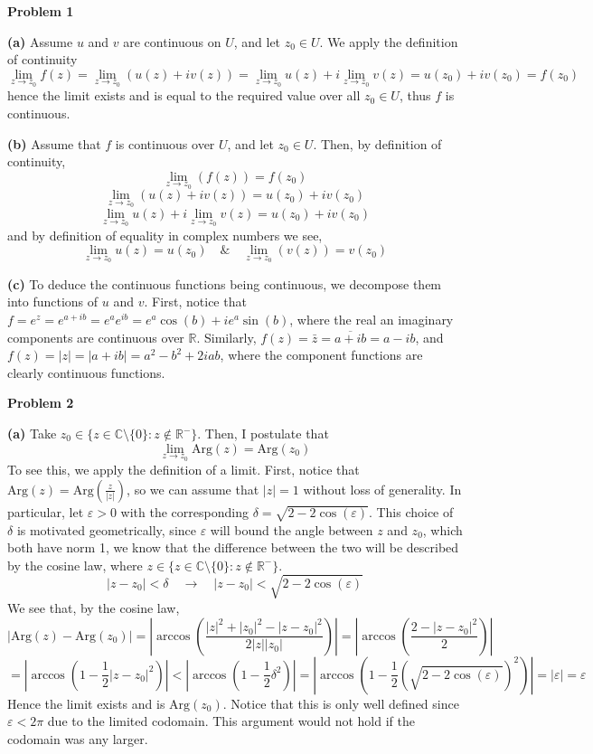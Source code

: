 \documentclass[10pt]{article}
\newcommand{\R}{\mathbb{R}}
\newcommand{\C}{\mathbb{C}}
\newcommand{\Arg}{\text{Arg}}
\begin{document}
\textbf{Problem 1}

\textbf{(a)}
Assume $u$ and $v$ are continuous on $U$, and let $z_{0}\in U$. We apply the definition of continuity
$$\lim_{z\to z_{0}} f(z) = \lim_{z\to z_{0}} (u(z) + iv(z)) = \lim_{z\to z_{0}}u(z) + i \lim_{z\to z_{0}}v(z) = u(z_{0}) + iv(z_{0}) = f(z_{0})$$
hence the limit exists and is equal to the required value over all $z_{0} \in U$, thus $f$ is continuous.

\textbf{(b)}
Assume that $f$ is continuous over $U$, and let $z_{0} \in U$. Then, by definition of continuity,
$$\lim_{z\to z_{0}}(f(z)) = f(z_{0})$$
$$\lim_{z\to z_{0}}(u(z) + iv(z)) = u(z_{0}) + iv(z_{0})$$
$$\lim_{z\to z_{0}}u(z) + i\lim_{z \to z_{0}}v(z) = u(z_{0}) + iv(z_{0})$$
and by definition of equality in complex numbers we see,
$$\lim_{z\to z_{0}}u(z) = u(z_{0}) \hspace{1em} \& \hspace{1em} \lim_{z \to z_{0}}(v(z)) = v(z_{0})$$

\textbf{(c)}
To deduce the continuous functions being continuous, we decompose them into functions of $u$ and $v$. First, notice that $f = e^{z} = e^{a + ib} = e^{a}e^{ib} = e^{a}\cos(b) + ie^{a}\sin(b)$, where the real an imaginary components are continuous over $\R$. Similarly, $f(z) = \bar{z} = \overline{a + ib} = a - ib$, and $f(z) = |z| = |a+ib| = a^{2}-b^{2} + 2iab$, where the component functions are clearly continuous functions.

\textbf{Problem 2}

\textbf{(a)} Take $z_{0} \in \{z\in\C \setminus \{0\}: z\notin \R^{-}\}$. Then, I postulate that
$$\lim_{z\to z_{0}} \Arg(z) = \Arg(z_{0})$$
To see this, we apply the definition of a limit. First, notice that $\Arg(z) = \Arg(\frac{z}{|z|})$, so we can assume that $|z| = 1$ without loss of generality. In particular, let $\varepsilon > 0$ with the corresponding $\delta = \sqrt{2 - 2\cos(\varepsilon)}$. This choice of $\delta$ is motivated geometrically, since $\varepsilon$ will bound the angle between $z$ and $z_{0}$, which both have norm 1, we know that the difference between the two will be described by the cosine law, where $z \in \{z\in\C \setminus \{0\}: z\notin \R^{-}\}$.
$$|z - z_{0}| < \delta \hspace{1em} \to \hspace{1em} |z - z_{0}| < \sqrt{2 - 2\cos(\varepsilon)}$$
We see that, by the cosine law,
$$|\Arg(z) - \Arg(z_{0})| = | \arccos \left(\frac{|z|^{2} + |z_{0}|^{2} - |z-z_{0}|^{2}}{2|z||z_{0}|}\right) | = |\arccos \left(\frac{2 - |z-z_{0}|^{2}}{2}\right)|$$
$$=|\arccos \left(1 - \frac{1}{2}|z - z_{0}|^{2}\right)| < |\arccos\left(1 - \frac{1}{2}\delta^{2}\right)| = |\arccos\left(1-\frac{1}{2}(\sqrt{2 -2\cos(\varepsilon)})^{2}\right)| = |\varepsilon| = \varepsilon$$
Hence the limit exists and is $\Arg(z_{0})$. Notice that this is only well defined since $\varepsilon < 2\pi$ due to the limited codomain. This argument would not hold if the codomain was any larger.
\end{document}
